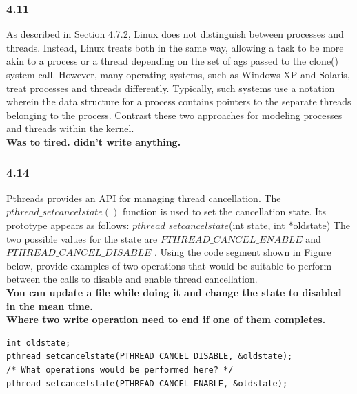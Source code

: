 \documentclass[a4paper,10pt,titlepage]{report}
\begin{document}
\subsubsection{4.11}
As described in Section 4.7.2, Linux does not distinguish between processes and threads. Instead, Linux treats both in the same way, allowing a task to be more akin to a process or a thread depending on the set of ags passed to the clone() system call. However, many operating systems, such as Windows XP and Solaris, treat processes and threads differently. Typically, such systems use a notation wherein the data structure for a process contains pointers to the separate threads belonging to the process. Contrast these two approaches for modeling processes and threads within the kernel.\\
\textbf{
Was to tired. didn't write anything.
}

\subsubsection{4.14}
Pthreads provides an API for managing thread cancellation. The $pthread\_setcancelstate()$ function is used to set the cancellation state. Its prototype appears as follows:  $pthread\_setcancelstate$(int state, int $*$oldstate) The two possible values for the state are $PTHREAD\_CANCEL\_ENABLE$ and $PTHREAD\_CANCEL\_DISABLE$ . Using the code segment shown in Figure below, provide examples of two operations that would be suitable to perform between the calls to disable and enable thread cancellation.\\
\textbf{
You can update a file while doing it and change the state to disabled in the mean time.
\\ \vspace{10mm}
Where two write operation need to end if one of them completes.
\\
}
\begin{lstlisting}[frame=single]
int oldstate;
pthread setcancelstate(PTHREAD CANCEL DISABLE, &oldstate);
/* What operations would be performed here? */
pthread setcancelstate(PTHREAD CANCEL ENABLE, &oldstate);
   
\end{lstlisting}
\end{document}
